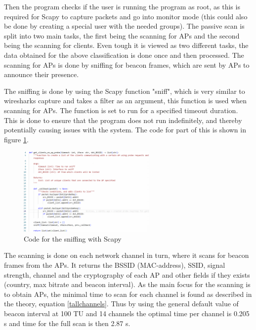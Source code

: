 Then the program checks if the user is running the program as root, as this is required for Scapy to capture packets and go into monitor mode (this could also be done by creating a special user with the needed groups). The passive scan is split into two main tasks, the first being the scanning for APs and the second being the scanning for clients. 
Even tough it is viewed as two different tasks, the data obtained for the above classification is done once and then processed.
The scanning for APs is done by sniffing for beacon frames, which are sent by APs to announce their presence.

The sniffing is done by using the Scapy function "sniff", which is very similar to wiresharks capture and takes a filter as an argument, this function is used when scanning for APs. The function is set to run for a specified timeout duration. This is done to ensure that the program does not run indefinitely, and thereby potentially causing issues with the system. The code for part of this is shown in figure \ref{Scan1}.
\begin{figure}[!htbp]
    \centering
    \includegraphics[width=0.6\textwidth]{Latex-Files/Billeder/Implementation/AP_Scan.png}
    \caption{Code for the sniffing with Scapy}
    \label{Scan1}
\end{figure}

The scanning is done on each network channel in turn, where it scans for beacon frames from the APs. It returns the BSSID (MAC-address), SSID, signal strength, channel and the cryptography of each AP and other fields if they exists (country, max bitrate and beacon interval). As the main focus for the scanning is to obtain APs, the minimal time to scan for each channel is found as described in the theory, equation \ref{tallchannels}. Thus by using the general default value of beacon interval at 100 TU and 14 channels the optimal time per channel is 0.205 s and time for the full scan is then 2.87 s.  

